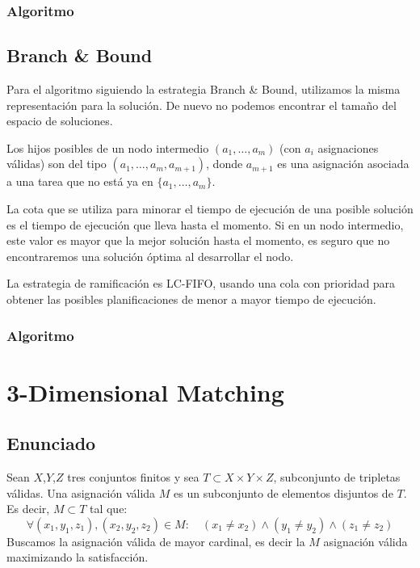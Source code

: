 \documentclass[a4paper, 11pt]{article} %
\begin{document}
    \subsubsection{Algoritmo}
    
      \small
      \texttt{}
      \normalsize
    
    \subsection{Branch \& Bound}
      Para el algoritmo siguiendo la estrategia Branch \& Bound, utilizamos la misma representación para la 
      solución. De nuevo no podemos encontrar el tamaño del espacio de soluciones. 
      
      Los hijos posibles de un nodo intermedio $(a_1, \dots, a_m)$ (con $a_i$ asignaciones válidas) son del tipo 
      $(a_1, \dots, a_m, a_{m+1})$, donde $a_{m+1}$ es una asignación asociada a una tarea que no está ya en 
      $\{a_1, \dots, a_m\}$.
      
      La cota que se utiliza para minorar el tiempo de ejecución de una posible solución es el tiempo de ejecución 
      que lleva hasta el momento. Si en un nodo intermedio, este valor es mayor que la mejor solución hasta el 
      momento, es seguro que no encontraremos una solución óptima al desarrollar el nodo.
      
      La estrategia de ramificación es LC-FIFO, usando una cola con prioridad para obtener las posibles 
      planificaciones de menor a mayor tiempo de ejecución.
    
      \subsubsection{Algoritmo}
      
        \small
        \texttt{}
        \normalsize
      
    \section{3-Dimensional Matching}
    \subsection{Enunciado}
    Sean $X$,$Y$,$Z$ tres conjuntos finitos y sea $T \subset X \times Y \times Z$, subconjunto de tripletas válidas.
    Una asignación válida $M$ es un subconjunto de elementos disjuntos de $T$. Es decir, $M \subset T$ tal que:
    \begin{equation}
        \forall (x_1,y_1,z_1), (x_2,y_2,z_2) \in M : \quad (x_1 \neq x_2) \wedge (y_1 \neq y_2) \wedge (z_1 \neq z_2)
        \end{equation} 
        Buscamos la asignación válida de mayor cardinal, es decir la $M$ asignación válida maximizando la satisfacción.
        
\end{document}
